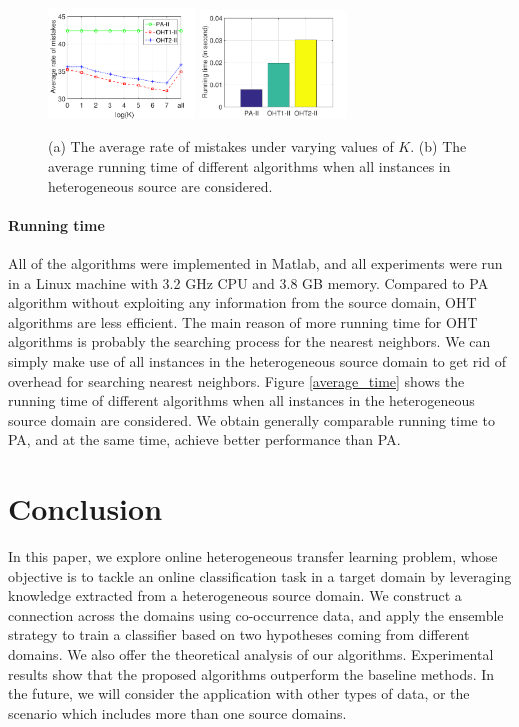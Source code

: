 \documentclass{article} %
\theoremstyle{remark}
\theoremstyle{definition}
\begin{document}
\begin{figure}[!htb]
\centering
  \subfigure
  {
    \label{average_error}
    \includegraphics[width=3.9cm]{average_error.pdf}
  }
  \subfigure
  {
    \label{average_time}
    \includegraphics[width=3.9cm]{average_time.pdf}
  }
  \caption{(a) The average rate of mistakes under varying values of $K$. (b) The average running time of different algorithms when all instances in heterogeneous source are considered.}
  \label{average eok}
\end{figure}

\paragraph{Running time}
All of the algorithms were implemented in Matlab, and all experiments were run in a Linux machine with 3.2 GHz CPU and 3.8 GB memory.
Compared to PA algorithm without exploiting any information from the source domain, OHT algorithms are less efficient.
The main reason of more running time for OHT algorithms is probably the searching process for the nearest neighbors.
We can simply make use of all instances in the heterogeneous source domain to get rid of overhead for searching nearest neighbors.
Figure \ref{average_time} shows the running time of different algorithms when all instances in the heterogeneous source domain are considered.
We obtain generally comparable running time to PA, and at the same time, achieve better performance than PA.

\section{Conclusion}

In this paper, we explore online heterogeneous transfer learning problem, whose objective is to tackle an online classification task in a target domain by leveraging knowledge extracted from a heterogeneous source domain.
We construct a connection across the domains using co-occurrence data, and apply the ensemble strategy to train a classifier based on two hypotheses coming from different domains.
We also offer the theoretical analysis of our algorithms.
Experimental results show that the proposed algorithms outperform the baseline methods.
In the future, we will consider the application with other types of data, or the scenario which includes more than one source domains.



\end{document}
